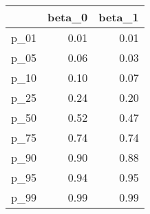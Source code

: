 \begin{table}[ht]
\centering
\begin{tabular}{rrr}
  \hline
 & beta\_0 & beta\_1 \\ 
  \hline
p\_01 & 0.01 & 0.01 \\ 
  p\_05 & 0.06 & 0.03 \\ 
  p\_10 & 0.10 & 0.07 \\ 
  p\_25 & 0.24 & 0.20 \\ 
  p\_50 & 0.52 & 0.47 \\ 
  p\_75 & 0.74 & 0.74 \\ 
  p\_90 & 0.90 & 0.88 \\ 
  p\_95 & 0.94 & 0.95 \\ 
  p\_99 & 0.99 & 0.99 \\ 
   \hline
\end{tabular}
\end{table}

